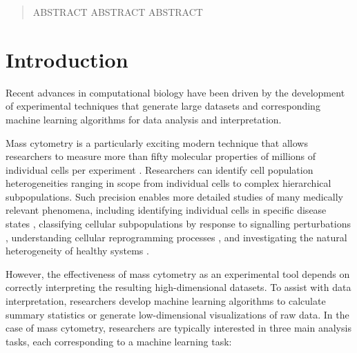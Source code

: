 \documentclass{article}
\begin{document}
 


\begin{abstract} 
ABSTRACT ABSTRACT ABSTRACT
\end{abstract} 

\section{Introduction}
\label{sec:introduction}
Recent advances in computational biology have been driven by the development of experimental techniques that generate large datasets and corresponding machine learning algorithms for data analysis and interpretation.  

Mass cytometry is a particularly exciting modern technique that allows researchers to measure more than fifty molecular properties of millions of individual cells per experiment \cite{}.
  Researchers can identify cell population heterogeneities ranging in scope from individual cells to complex hierarchical subpopulations. 
Such precision enables more detailed studies of many medically relevant phenomena, including identifying individual cells in specific disease states \cite{}, classifying cellular subpopulations by response to signalling perturbations \cite{}, understanding cellular reprogramming processes \cite{}, and investigating the natural heterogeneity of healthy systems \cite{}.  

However, the effectiveness of mass cytometry as an experimental tool depends on correctly interpreting the resulting high-dimensional datasets. 
To assist with data interpretation, researchers develop machine learning algorithms to calculate summary statistics or generate low-dimensional visualizations of raw data.
 In the case of mass cytometry, researchers are typically interested in three main analysis tasks, each corresponding to a machine learning task:
\end{document}
